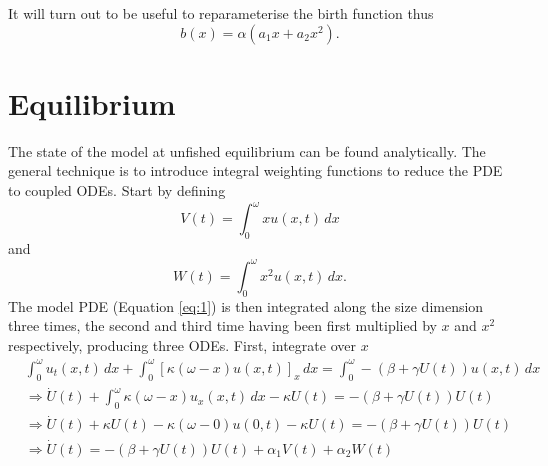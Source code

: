 \documentclass{article}
\begin{document}
It will turn out to be useful to reparameterise the birth function thus
\begin{equation}
  b(x) = \alpha(a_1 x+a_2 x^2).
\end{equation}

\section{Equilibrium}
The state of the model at unfished equilibrium can be found analytically. The general technique is to introduce integral weighting functions to reduce the PDE to coupled ODEs. Start by defining
\begin{equation}
    V(t) = \int_0^{\omega} x u(x,t)\, dx
\end{equation}
and
\begin{equation}
    W(t) = \int_0^{\omega} x^2 u(x,t)\, dx .
\end{equation}
The model PDE (Equation \ref{eq:1}) is then integrated along the size dimension three times, the second and third time having been first multiplied by $x$ and $x^2$ respectively, producing three ODEs. First, integrate over $x$
\begin{subequations}
  \begin{align}
    &\int_0^{\omega} u_t(x,t)\,dx + \int_0^{\omega} [\kappa(\omega-x)u(x,t)]_x \, dx = \int_0^{\omega} -(\beta+\gamma U(t)) u(x,t)\, dx\\
    &\Rightarrow \dot{U}(t) + \int_0^{\omega} \kappa(\omega-x)u_x(x,t)\,dx - \kappa  U(t) = -(\beta+\gamma U(t)) U(t)\\%
    &\Rightarrow\dot{U}(t) + \kappa U(t) - \kappa(\omega-0)u(0,t) - \kappa  U(t) = -(\beta+\gamma U(t)) U(t)\\
    &\Rightarrow \dot{U}(t) = -(\beta+\gamma U(t)) U(t) + \alpha_1 V(t) + \alpha_2 W(t)
  \end{align}
\end{subequations}
\end{document}

